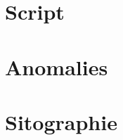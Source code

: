 \documentclass[5pt]{article}
\begin{document}
    \section{Script}
    
    \section{Anomalies}

    \section{Sitographie}
\end{document}
